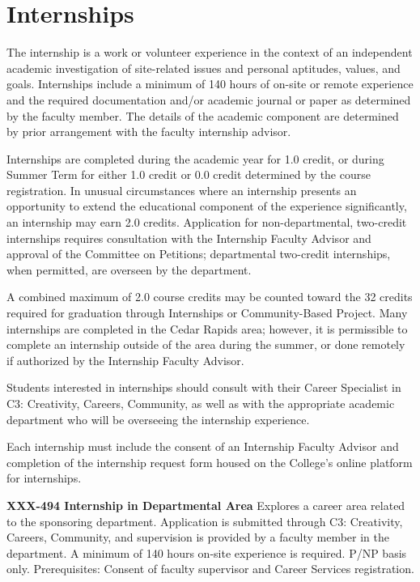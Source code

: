 \documentclass[
  letterpaper,
]{scrbook}
\begin{document}
\section{Internships}\label{internships}

The internship is a work or volunteer experience in the context of an
independent academic investigation of site-related issues and personal
aptitudes, values, and goals. Internships include a minimum of 140 hours
of on-site or remote experience and the required documentation and/or
academic journal or paper as determined by the faculty member. The
details of the academic component are determined by prior arrangement
with the faculty internship advisor.

Internships are completed during the academic year for 1.0 credit, or
during Summer Term for either 1.0 credit or 0.0 credit determined by the
course registration. In unusual circumstances where an internship
presents an opportunity to extend the educational component of the
experience significantly, an internship may earn 2.0 credits.
Application for non-departmental, two-credit internships requires
consultation with the Internship Faculty Advisor and approval of the
Committee on Petitions; departmental two-credit internships, when
permitted, are overseen by the department.

A combined maximum of 2.0 course credits may be counted toward the 32
credits required for graduation through Internships or Community-Based
Project. Many internships are completed in the Cedar Rapids area;
however, it is permissible to complete an internship outside of the area
during the summer, or done remotely if authorized by the Internship
Faculty Advisor.

Students interested in internships should consult with their Career
Specialist in C3: Creativity, Careers, Community, as well as with the
appropriate academic department who will be overseeing the internship
experience.

Each internship must include the consent of an Internship Faculty
Advisor and completion of the internship request form housed on the
College's online platform for internships.

\textbf{XXX-494 Internship in Departmental Area} Explores a career area
related to the sponsoring department. Application is submitted through
C3: Creativity, Careers, Community, and supervision is provided by a
faculty member in the department. A minimum of 140 hours on-site
experience is required. P/NP basis only. Prerequisites: Consent of
faculty supervisor and Career Services registration.
\end{document}
